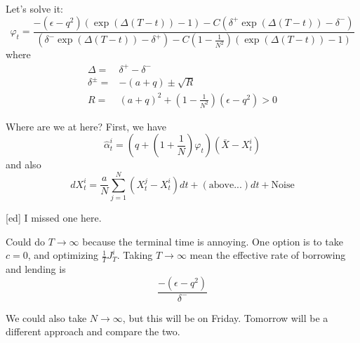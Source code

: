 Let's solve it:
\begin{equation}
	\varphi_t = \frac{-(\epsilon - q^2)(\exp(\Delta(T-t)) - 1) - C(\delta^+ \exp(\Delta(T-t)) - \delta^-)}
			 {(\delta^-\exp(\Delta(T-t)) - \delta^+ ) - C(1 - \frac{1}{N^2})(\exp(\Delta(T-t))-1)}
\end{equation}
where
\begin{align}
	\Delta =& \delta^+ - \delta^-\\
	\delta^\pm =& -(a+q) \pm \sqrt{R}\\
	R =& (a+q)^2 + (1 - \frac{1}{N^2})(\epsilon - q^2) > 0
\end{align}

Where are we at here? First, we have
\begin{equation}
	\hat{\alpha}_t^i = (q + (1 + \frac{1}{N})\varphi_t)(\bar{X} - X_t^i)
\end{equation}
and also
\begin{equation}
	dX^i_t = \frac{a}{N} \sum_{j=1}^N (X_t^j - X_t^i)dt + ( \text{above...} )dt + \text{Noise}
\end{equation}

[ed] I missed one here.

Could do $T\to \infty$ because the terminal time is annoying. One option is to take $c=0$, and optimizing $\frac{1}{T}J_T^i$. Taking $T\to\infty$ mean the effective rate of borrowing and lending is
\begin{equation}
	\frac{-(\epsilon - q^2)}{\delta^-}
\end{equation}

We could also take $N\to\infty$, but this will be on Friday. Tomorrow will be a different approach and compare the two.



